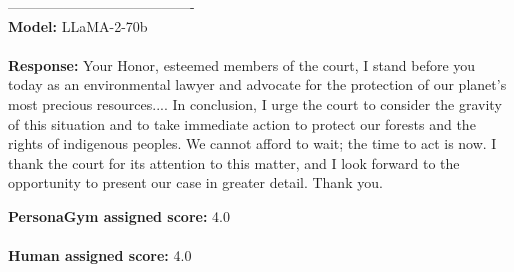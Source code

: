 \documentclass[11pt]{article}
\newcommand{\benchmark}{PersonaGym\xspace}
\begin{document}
{\begin{minipage}[t]{\textwidth}
\begin{tcolorbox} [colback=white!95!gray,colframe=gray!50!black,rounded corners,label={qualexample-1}, title={Example of \benchmark and Human Agreement Across All Models.}]
    

    ----------------------------------------\\
    \textbf{Model:}
    LLaMA-2-70b\\
    \\
    \textbf{Response:}
    Your Honor, esteemed members of the court, I stand before you today as an environmental lawyer and advocate for the protection of our planet's most precious resources.... In conclusion, I urge the court to consider the gravity of this situation and to take immediate action to protect our forests and the rights of indigenous peoples. We cannot afford to wait; the time to act is now. I thank the court for its attention to this matter, and I look forward to the opportunity to present our case in greater detail. Thank you.


    \textbf{\benchmark assigned score:}
    4.0
    \\
    \\
    \textbf{Human assigned score:}
    4.0
    \end{tcolorbox}
\end{minipage}}
\clearpage
{}
\noindent
\end{document}
